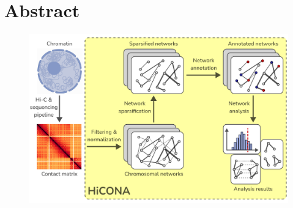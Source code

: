 \graphicspath{{chapters/01_abstract/images}}
\chapter*{Abstract}
\vspace{-1.5cm}

\begin{figure}[h]
  \centering
  \includegraphics[width=1\textwidth]{graphical_abstract.png}
\end{figure}

